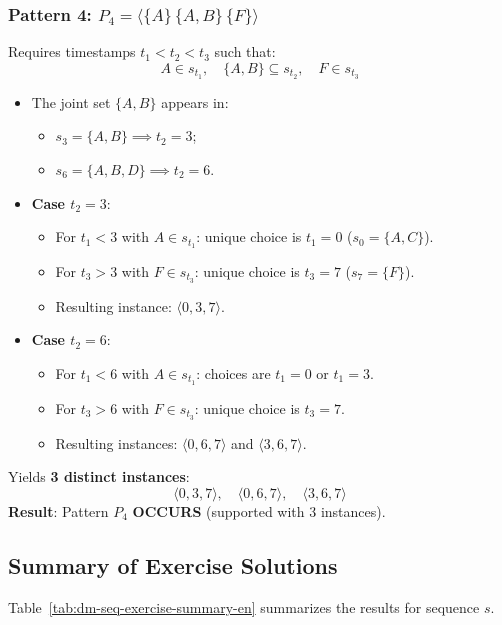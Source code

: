 \subsubsection{Pattern 4: $P_4 = \langle \{A\} \, \{A, B\} \, \{F\} \rangle$}
Requires timestamps $t_1 < t_2 < t_3$ such that:
\begin{equation*}
A \in s_{t_1}, \quad \{A, B\} \subseteq s_{t_2}, \quad F \in s_{t_3}
\end{equation*}
\begin{itemize}
    \item The joint set $\{A, B\}$ appears in:
    \begin{itemize}[noitemsep]
        \item $s_3 = \{A, B\} \implies t_2 = 3$;
        \item $s_6 = \{A, B, D\} \implies t_2 = 6$.
    \end{itemize}
    \item \textbf{Case $t_2 = 3$}:
    \begin{itemize}[noitemsep]
        \item For $t_1 < 3$ with $A \in s_{t_1}$: unique choice is $t_1 = 0$ ($s_0 = \{A, C\}$).
        \item For $t_3 > 3$ with $F \in s_{t_3}$: unique choice is $t_3 = 7$ ($s_7 = \{F\}$).
        \item Resulting instance: $\langle 0, 3, 7 \rangle$.
    \end{itemize}
    \item \textbf{Case $t_2 = 6$}:
    \begin{itemize}[noitemsep]
        \item For $t_1 < 6$ with $A \in s_{t_1}$: choices are $t_1 = 0$ or $t_1 = 3$.
        \item For $t_3 > 6$ with $F \in s_{t_3}$: unique choice is $t_3 = 7$.
        \item Resulting instances: $\langle 0, 6, 7 \rangle$ and $\langle 3, 6, 7 \rangle$.
    \end{itemize}
\end{itemize}
Yields \textbf{3 distinct instances}:
\begin{equation}
\langle 0, 3, 7 \rangle, \quad \langle 0, 6, 7 \rangle, \quad \langle 3, 6, 7 \rangle
\end{equation}
\textbf{Result}: Pattern $P_4$ \textbf{OCCURS} (supported with 3 instances).

\subsection{Summary of Exercise Solutions}
Table~\ref{tab:dm-seq-exercise-summary-en} summarizes the results for sequence $s$.

